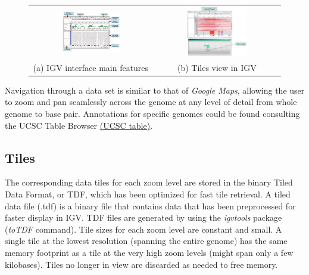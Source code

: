     \begin{figure}[H]
        \begin{tabular}{cc}
          \includegraphics[width=0.5\textwidth]{IGVview.PNG} &   \includegraphics[width=0.5\textwidth]{TileView.PNG} \\
        (a) IGV interface main features & (b) Tiles view in IGV \\[6pt]
        \end{tabular}
        \caption{}
        \label{fig:IGV_navigation}
    \end{figure}

    Navigation through a data set is similar to that of \textit{Google Maps}, allowing the user to zoom and pan seamlessly across the genome at any level of detail from whole genome to base pair.
    Annotations for specific genomes could be found consulting the UCSC Table Browser \href{http://genome.ucsc.edu/cgi-bin/hgTables}{(UCSC table)}.\\

    \subsection{Tiles}
    The corresponding data tiles for each zoom level are stored in the binary Tiled Data Format, or TDF, which has been optimized for fast tile retrieval.
    A tiled data file (.tdf) is a binary file that contains data that has been preprocessed for faster display in IGV.
    TDF files are generated by using the \textit{igvtools} package (\textit{toTDF} command).
    Tile sizes for each zoom level are constant and small.
    A single tile at the lowest resolution (spanning the entire genome) has the same memory footprint as a tile at the very high zoom levels (might span only a few kilobases).
    Tiles no longer in view are discarded as needed to free memory.

